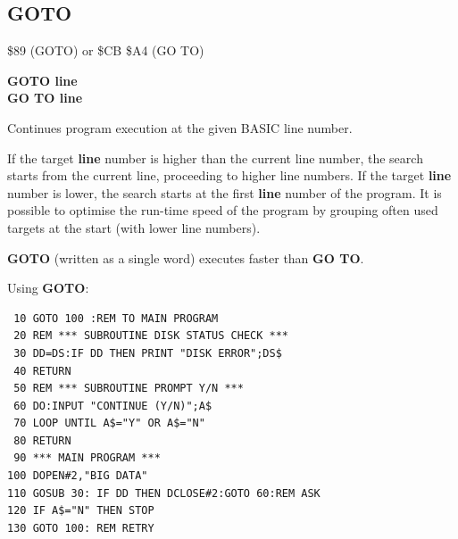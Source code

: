 
\newpage
\subsection{GOTO}
\begin{description}[leftmargin=2cm,style=nextline]
\item [Token:] \$89 (GOTO) or \$CB \$A4 (GO TO)
\item [Format:] {\bf GOTO line} \\
                {\bf GO TO line}
\item [Usage:] Continues program
               execution at the given BASIC line number.

\item [Remarks:] If the target {\bf line} number is higher than the current line number, the
               search starts from the current line, proceeding to higher line numbers.
               If the target {\bf line} number is lower, the search starts
               at the first {\bf line} number of the program.
               It is possible to optimise
               the run-time speed of the program by grouping often used targets at the
               start (with lower line numbers).

               {\bf GOTO} (written as a single word) executes faster than {\bf GO TO}.

\item [Example:] Using {\bf GOTO}:
\begin{tcolorbox}[colback=black,coltext=white]
\verbatimfont{\codefont}
\begin{verbatim}
 10 GOTO 100 :REM TO MAIN PROGRAM
 20 REM *** SUBROUTINE DISK STATUS CHECK ***
 30 DD=DS:IF DD THEN PRINT "DISK ERROR";DS$
 40 RETURN
 50 REM *** SUBROUTINE PROMPT Y/N ***
 60 DO:INPUT "CONTINUE (Y/N)";A$
 70 LOOP UNTIL A$="Y" OR A$="N"
 80 RETURN
 90 *** MAIN PROGRAM ***
100 DOPEN#2,"BIG DATA"
110 GOSUB 30: IF DD THEN DCLOSE#2:GOTO 60:REM ASK
120 IF A$="N" THEN STOP
130 GOTO 100: REM RETRY
\end{verbatim}
\end{tcolorbox}
\end{description}


\newpage
